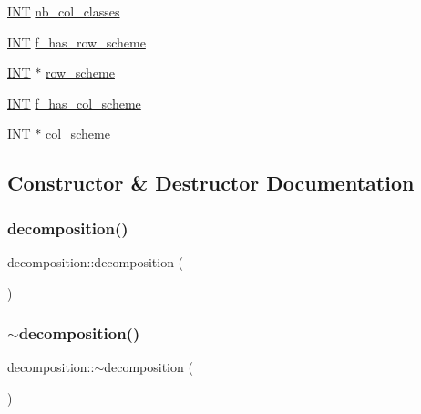 \begin{DoxyCompactItemize}
\mbox{\hyperlink{galois_8h_a09fddde158a3a20bd2dcadb609de11dc}{I\+NT}} \mbox{\hyperlink{classdecomposition_a3969e80e54af9dd7e49be7fb0889eff4}{nb\+\_\+col\+\_\+classes}}
\item 
\mbox{\hyperlink{galois_8h_a09fddde158a3a20bd2dcadb609de11dc}{I\+NT}} \mbox{\hyperlink{classdecomposition_a1cc58711a0c004d3ce197021f2993e29}{f\+\_\+has\+\_\+row\+\_\+scheme}}
\item 
\mbox{\hyperlink{galois_8h_a09fddde158a3a20bd2dcadb609de11dc}{I\+NT}} $\ast$ \mbox{\hyperlink{classdecomposition_a15874e1658c73e50022551bb652b0838}{row\+\_\+scheme}}
\item 
\mbox{\hyperlink{galois_8h_a09fddde158a3a20bd2dcadb609de11dc}{I\+NT}} \mbox{\hyperlink{classdecomposition_a3147c55565c1edf4245cb76c98a1c1bf}{f\+\_\+has\+\_\+col\+\_\+scheme}}
\item 
\mbox{\hyperlink{galois_8h_a09fddde158a3a20bd2dcadb609de11dc}{I\+NT}} $\ast$ \mbox{\hyperlink{classdecomposition_a819b7f63fb13a8a03915d3ce9902a54a}{col\+\_\+scheme}}
\end{DoxyCompactItemize}


\subsection{Constructor \& Destructor Documentation}
\mbox{\label{classdecomposition_a7e381393157c79ff35fd735fb6f9d949}} 
\subsubsection{\texorpdfstring{decomposition()}{decomposition()}}
{\footnotesize\ttfamily decomposition\+::decomposition (\begin{DoxyParamCaption}{ }\end{DoxyParamCaption})}

\mbox{\label{classdecomposition_a3dd914483ded567dd02ea8842aa54911}} 
\subsubsection{\texorpdfstring{$\sim$decomposition()}{~decomposition()}}
{\footnotesize\ttfamily decomposition\+::$\sim$decomposition (\begin{DoxyParamCaption}{ }\end{DoxyParamCaption})}



